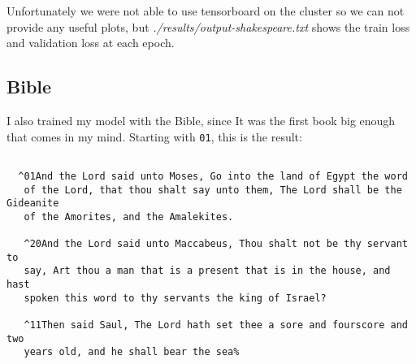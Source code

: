 \documentclass[11pt]{article}
\begin{document}
Unfortunately we were not able to use tensorboard on the cluster so we can not provide any useful plots, but \emph{./results/output-shakespeare.txt} shows the train loss and validation loss at each epoch.
\subsection{Bible}
I also trained my model with the Bible, since It was the first book big enough that comes in my mind. Starting with \texttt{01}, this is the result:
\begin{lstlisting}[breaklines=true]

  ^01And the Lord said unto Moses, Go into the land of Egypt the word
   of the Lord, that thou shalt say unto them, The Lord shall be the Gideanite
   of the Amorites, and the Amalekites.

   ^20And the Lord said unto Maccabeus, Thou shalt not be thy servant to
   say, Art thou a man that is a present that is in the house, and hast
   spoken this word to thy servants the king of Israel?

   ^11Then said Saul, The Lord hath set thee a sore and fourscore and two
   years old, and he shall bear the sea%	
\end{lstlisting}
\end{document}
